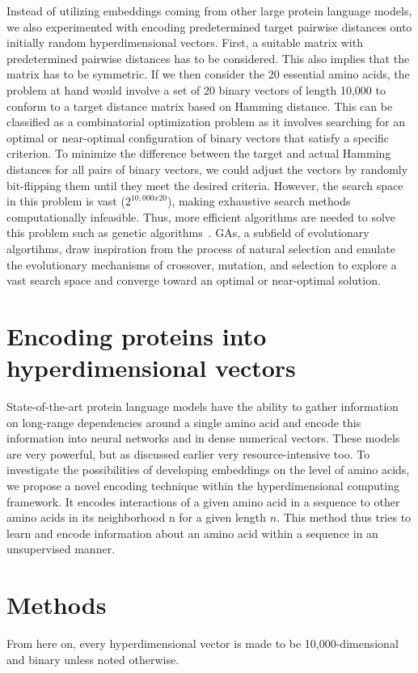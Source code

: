 Instead of utilizing embeddings coming from other large protein language models, we also experimented with encoding predetermined target pairwise distances onto initially random hyperdimensional vectors. First, a suitable matrix with predetermined pairwise distances has to be considered. This also implies that the matrix has to be symmetric. If we then consider the 20 essential amino acids, the problem at hand would involve a set of 20 binary vectors of length 10,000 to conform to a target distance matrix based on Hamming distance. This can be classified as a combinatorial optimization problem as it involves searching for an optimal or near-optimal configuration of binary vectors that satisfy a specific criterion. To minimize the difference between the target and actual Hamming distances for all pairs of binary vectors, we could adjust the vectors by randomly bit-flipping them until they meet the desired criteria. However, the search space in this problem is vast ($2^{10,000 x 20}$), making exhaustive search methods computationally infeasible. Thus, more efficient algorithms are needed to solve this problem such as genetic algorithms~\cite{GA}. GAs, a subfield of evolutionary algortihms, draw inspiration from the process of natural selection and emulate the evolutionary mechanisms of crossover, mutation, and selection to explore a vast search space and converge toward an optimal or near-optimal solution.

\section{Encoding proteins into hyperdimensional vectors}
State-of-the-art protein language models have the ability to gather information on long-range dependencies around a single amino acid and encode this information into neural networks and in dense numerical vectors. These models are very powerful, but as discussed earlier very resource-intensive too. To investigate the possibilities of developing embeddings on the level of amino acids, we propose a novel encoding technique within the hyperdimensional computing framework. It encodes interactions of a given amino acid in a sequence to other amino acids in its neighborhood n for a given length $n$. This method thus tries to learn and encode information about an amino acid within a sequence in an unsupervised manner.
\section{Methods}
From here on, every hyperdimensional vector is made to be 10,000-dimensional and binary unless noted otherwise. 
